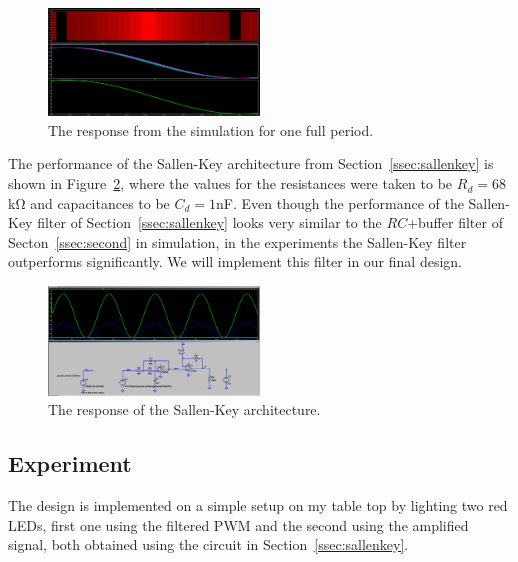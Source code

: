\begin{figure}[t]
\includegraphics[width=0.5\textwidth]{./figures/pwm_filtered_one_two_final_signal.png}
\caption{The response from the simulation for one full period.} 
\label{fig:response}
\end{figure}


The performance of the Sallen-Key architecture from Section~\ref{ssec:sallenkey}
is shown in Figure~\ref{fig:sallenkey_sim}, where the values for the resistances
were taken to be $R_d = 68$\unit{\kilo\ohm} and capacitances to be $C_d =
1$\unit{\nano\farad}. Even though the performance of the Sallen-Key filter of
Section~\ref{ssec:sallenkey} looks very similar to the $RC$+buffer filter of
Secton~\ref{ssec:second} in simulation, in the experiments the Sallen-Key filter
outperforms significantly. We will implement this filter in our final design.

\begin{figure}[t]
\includegraphics[width=0.5\textwidth]{./figures/sallenkey.png}
\caption{The response of the Sallen-Key architecture.}
\label{fig:sallenkey_sim}
\end{figure}


\vspace{-1em}
\subsection{Experiment}
\vspace{-1em}

The design is implemented on a simple setup on my table top by lighting two red
LEDs, first one using the filtered PWM and the second using the amplified
signal, both obtained using the circuit in Section~\ref{ssec:sallenkey}.



